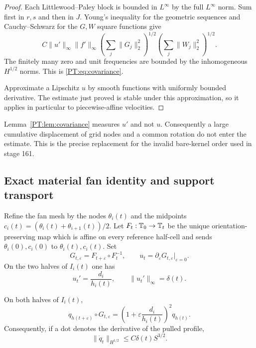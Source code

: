 \begin{proof}
Each Littlewood--Paley block is bounded in $L^\infty$ by the full
$L^\infty$ norm.  Sum first in $r,s$ and then in $J$.  Young's inequality
for the geometric sequences and Cauchy--Schwarz for the $G,W$ square
functions give
\[
 C\|u'\|_\infty\|f'\|_\infty
 \left(\sum_j\|G_j\|_2^2\right)^{1/2}
 \left(\sum_j\|W_j\|_2^2\right)^{1/2}.
\]
The finitely many zero and unit frequencies are bounded by the
inhomogeneous $H^{1/2}$ norms.  This is \eqref{PT:eq:covariance}.

Approximate a Lipschitz $u$ by smooth functions with uniformly bounded
derivative.  The estimate just proved is stable under this approximation,
so it applies in particular to piecewise-affine velocities.
\end{proof}

\begin{remark}
Lemma~\ref{PT:lem:covariance} measures $u'$ and not $u$.  Consequently a
large cumulative displacement of grid nodes and a common rotation do not
enter the estimate.  This is the precise replacement for the invalid
bare-kernel order used in stage 161.
\end{remark}

\subsection{Exact material fan identity and support transport}

Refine the fan mesh by the nodes $\theta_i(t)$ and the midpoints
$c_i(t)=(\theta_i(t)+\theta_{i+1}(t))/2$.  Let
$F_t:\mathbb T_0\to\mathbb T_t$ be the unique orientation-preserving map which is
affine on every reference half-cell and sends
\(\theta_i(0),c_i(0)\) to \(\theta_i(t),c_i(t)\).  Set
\begin{equation}\label{PT:eq:finite-material-map}
 G_{t,\varepsilon}=F_{t+\varepsilon}\circ F_t^{-1},
 \qquad
 u_t=\partial_\varepsilon G_{t,\varepsilon}\big|_{\varepsilon=0}.
\end{equation}
On the two halves of $I_i(t)$ one has
\begin{equation}\label{PT:eq:uprime}
 u_t'=\frac{d_i}{h_i(t)},
 \qquad \|u_t'\|_\infty=\delta(t).
\end{equation}

\begin{lemma}\label{PT:lem:q-transport}
On both halves of $I_i(t)$,
\begin{equation}\label{PT:eq:q-transport}
 q_{h(t+\varepsilon)}\circ G_{t,\varepsilon}
 =\left(1+\varepsilon\frac{d_i}{h_i(t)}\right)^2q_{h(t)}.
\end{equation}
Consequently, if a dot denotes the derivative of the pulled profile,
\begin{equation}\label{PT:eq:qdot}
 \|\dot q_t\|_{H^{1/2}}
 \le C\delta(t)S^{3/2}.
\end{equation}
\end{lemma}

